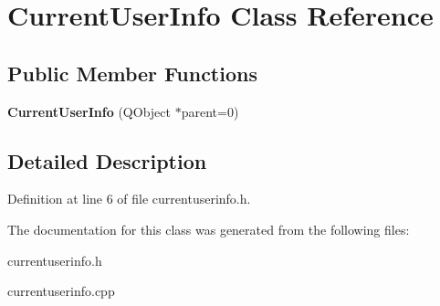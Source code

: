 \hypertarget{class_current_user_info}{
\section{CurrentUserInfo Class Reference}
\label{class_current_user_info}
}
\subsection*{Public Member Functions}
\begin{DoxyCompactItemize}
\item 
\hypertarget{class_current_user_info_aa3fbd22aedbe36685387ffb250f513f1}{
{\bfseries CurrentUserInfo} (QObject $\ast$parent=0)}
\label{class_current_user_info_aa3fbd22aedbe36685387ffb250f513f1}

\end{DoxyCompactItemize}


\subsection{Detailed Description}


Definition at line 6 of file currentuserinfo.h.



The documentation for this class was generated from the following files:\begin{DoxyCompactItemize}
\item 
currentuserinfo.h\item 
currentuserinfo.cpp\end{DoxyCompactItemize}
